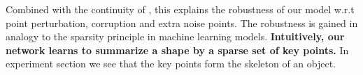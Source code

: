 \documentclass[10pt,twocolumn,letterpaper]{article}
\newcommand{\cmt}[2]{[#1: #2]}
\newcommand{\todo}[1]{\cmt{{\bf TODO}}{{\bf \color{red} #1}}}
\begin{document}
Combined with the continuity of , this explains the robustness of our model w.r.t point perturbation, corruption and extra noise points. The robustness is gained in analogy to the sparsity principle in machine learning models. {\bf  Intuitively, our network learns to summarize a shape by a sparse set of key points.} In experiment section we see that the key points form the skeleton of an object.




\begin{comment}
\subsection{The properties of point sets in }
\todo{
  our input is a subset of points from a Euclidean space. It has three main properties:
  \begin{itemize}
    \item as a set, points in it has no order; 
    \item the points are from a metric space. therefore, local structures from near points have to be characterized;
    \item as a geometric object, the learned representation of the point set should be invariant to certain transformations.
  \end{itemize}
  the above three properties of our input leads to the three key ideas of our network design. we explain one by one.
}
\subsection{Unordered point set as input}
\todo{
  \begin{itemize}
    \item three strategies exist: 1) sorting input into a canonical order; 2)  use RNN but train order-invariantly; 3) use a symmetric function to aggregate the information from each point. 
    \item theoretically and empirically argue that the first two choices are not good. 
    \item our idea is to approximate a general function defined on a point set by applying a symmetric function on transformed elements in the set:  where ,  and  is a symmetric function.
    \item we think this is provable for some good .
    \item empirically, we approximate  by a multi-layer perceptron network and  by a composition of a single variable function and a max pooling function. this is found to work well by experiments.
    \item we can learn a number of 's to capture different properties of the set.
  \end{itemize}
}


\end{comment}
\end{document}
